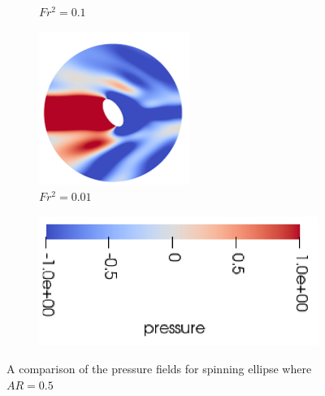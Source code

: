 \begin{figure}
\begin{subfigure}[b]{0.25\textwidth}
        \caption{$Fr^2 = 0.1$}
        \label{fig:par0p5fs0p1}
    \end{subfigure}
    \hfill
    \begin{subfigure}[b]{0.25\textwidth}
        \centering
        \includegraphics[width=\textwidth]{images/spinning_ellipse/par0p5fs0p01.png}
        \caption{$Fr^2 = 0.01$}
        \label{fig:par0p5fs0p01}
    \end{subfigure}
    
    \begin{subfigure}[b]{0.25\textwidth}
        \centering
        \includegraphics[width=\textwidth]{images/spinning_ellipse/p_scale.png}
        \caption*{}
    \end{subfigure}
    
    \caption{A comparison of the pressure fields for spinning ellipse where $AR = 0.5$}
    \label{fig:ar0p5_pressure}
\end{figure}
\clearpage
